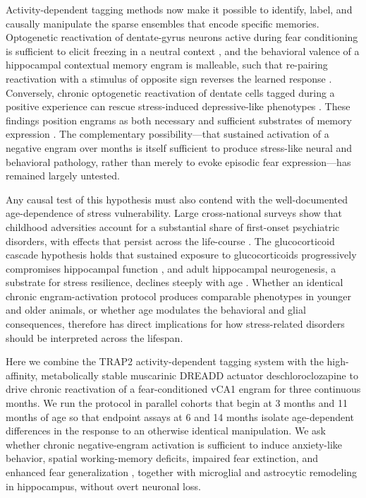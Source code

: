 \documentclass[11pt]{article}
\begin{document}
Activity-dependent tagging methods now make it possible to identify, label, and causally manipulate the sparse ensembles that encode specific memories. Optogenetic reactivation of dentate-gyrus neurons active during fear conditioning is sufficient to elicit freezing in a neutral context \citep{liu2012engram}, and the behavioral valence of a hippocampal contextual memory engram is malleable, such that re-pairing reactivation with a stimulus of opposite sign reverses the learned response \citep{redondo2014valence}. Conversely, chronic optogenetic reactivation of dentate cells tagged during a positive experience can rescue stress-induced depressive-like phenotypes \citep{ramirez2015positive}. These findings position engrams as both necessary and sufficient substrates of memory expression \citep{josselyn2020engram}. The complementary possibility---that sustained activation of a negative engram over months is itself sufficient to produce stress-like neural and behavioral pathology, rather than merely to evoke episodic fear expression---has remained largely untested.

Any causal test of this hypothesis must also contend with the well-documented age-dependence of stress vulnerability. Large cross-national surveys show that childhood adversities account for a substantial share of first-onset psychiatric disorders, with effects that persist across the life-course \citep{kessler2010childhood}. The glucocorticoid cascade hypothesis holds that sustained exposure to glucocorticoids progressively compromises hippocampal function \citep{sapolsky1986glucocorticoid}, and adult hippocampal neurogenesis, a substrate for stress resilience, declines steeply with age \citep{klempin2007neurogenesis}. Whether an identical chronic engram-activation protocol produces comparable phenotypes in younger and older animals, or whether age modulates the behavioral and glial consequences, therefore has direct implications for how stress-related disorders should be interpreted across the lifespan.

Here we combine the TRAP2 activity-dependent tagging system \citep{denardo2019temporal} with the high-affinity, metabolically stable muscarinic DREADD actuator deschloroclozapine \citep{nagai2020dcz,roth2016dreadds} to drive chronic reactivation of a fear-conditioned vCA1 engram for three continuous months. We run the protocol in parallel cohorts that begin at 3 months and 11 months of age so that endpoint assays at 6 and 14 months isolate age-dependent differences in the response to an otherwise identical manipulation. We ask whether chronic negative-engram activation is sufficient to induce anxiety-like behavior, spatial working-memory deficits, impaired fear extinction, and enhanced fear generalization \citep{maren2013contextual,tovote2015circuits}, together with microglial and astrocytic remodeling in hippocampus, without overt neuronal loss.
\end{document}
